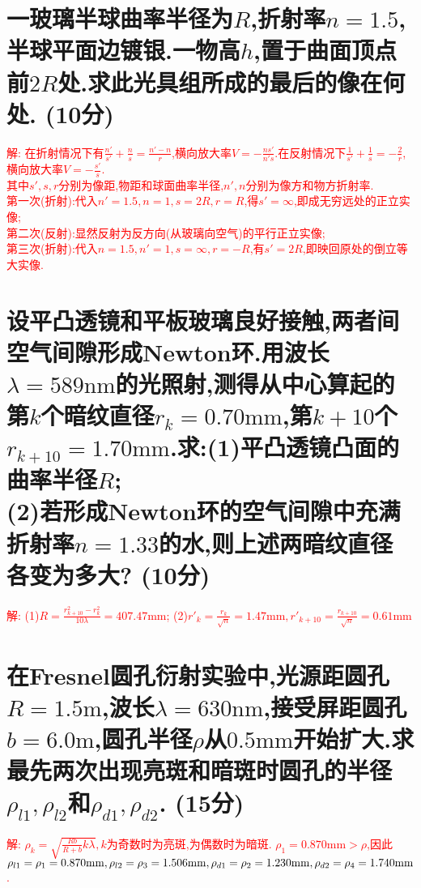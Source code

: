 \documentclass[UTF8]{article}
\newcommand{\m}{\mathrm{m}}
\newcommand{\mm}{\mathrm{mm}}
\newcommand{\nm}{\mathrm{nm}}
\newcommand\pts[1]{ \small{(#1分)}}
\begin{document}
    \section{一玻璃半球曲率半径为$R$,折射率$n=1.5$,半球平面边镀银.一物高$h$,置于曲面顶点前$2R$处.求此光具组所成的最后的像在何处. \pts{10}}
    \noindent \textcolor{red}{解: 在折射情况下有$\frac{n'}{s'}+\frac{n}{s}=\frac{n'-n}{r}$,横向放大率$V=-\frac{ns'}{n's}$.在反射情况下$\frac{1}{s'}+\frac{1}{s}=-\frac{2}{r}$,横向放大率$V=-\frac{s'}{s}$.\\ 其中$s',s,r$分别为像距,物距和球面曲率半径,$n',n$分别为像方和物方折射率.\\ 
    第一次(折射):代入$n'=1.5,n=1,s=2R,r=R$,得$s'=\infty$,即成无穷远处的正立实像;\\ 第二次(反射):显然反射为反方向(从玻璃向空气)的平行正立实像;\\ 第三次(折射):代入$n=1.5,n'=1,s=\infty,r=-R$,有$s'=2R$,即映回原处的倒立等大实像.}

    \section{设平凸透镜和平板玻璃良好接触,两者间空气间隙形成Newton环.用波长$\lambda=589\nm$的光照射,测得从中心算起的第$k$个暗纹直径$r_k=0.70\mm$,第$k+10$个$r_{k+10}=1.70\mm$.求:(1)平凸透镜凸面的曲率半径$R$;\\ (2)若形成Newton环的空气间隙中充满折射率$n=1.33$的水,则上述两暗纹直径各变为多大?\pts{10}}
    \noindent \textcolor{red}{解: (1)$R=\frac{r^2_{k+10}-r^2_k}{10\lambda}=407.47\mm $; (2)$r'_k=\frac{r_k}{\sqrt{n}}=1.47\mm , r'_{k+10}=\frac{r_{k+10}}{\sqrt{n}}=0.61\mm $}

    \section{在Fresnel圆孔衍射实验中,光源距圆孔$R=1.5\m$,波长$\lambda=630\nm$,接受屏距圆孔$b=6.0\m$,圆孔半径$\rho$从$0.5\mm$开始扩大.求最先两次出现亮斑和暗斑时圆孔的半径$\rho_{l1},\rho_{l2}$和$\rho_{d1},\rho_{d2}$.\pts{15}}
    \noindent \textcolor{red}{解: $\rho_k=\sqrt{\frac{Rb}{R+b} k\lambda}, k$为奇数时为亮斑,为偶数时为暗斑. $\rho_1=0.870\mm>\rho$,因此$\rho_{l1}=\rho_1=0.870\mm,\\ \rho_{l2}=\rho_3=1.506\mm,\rho_{d1}=\rho_2=1.230\mm,\rho_{d2}=\rho_4=1.740\mm$.}
\end{document}
